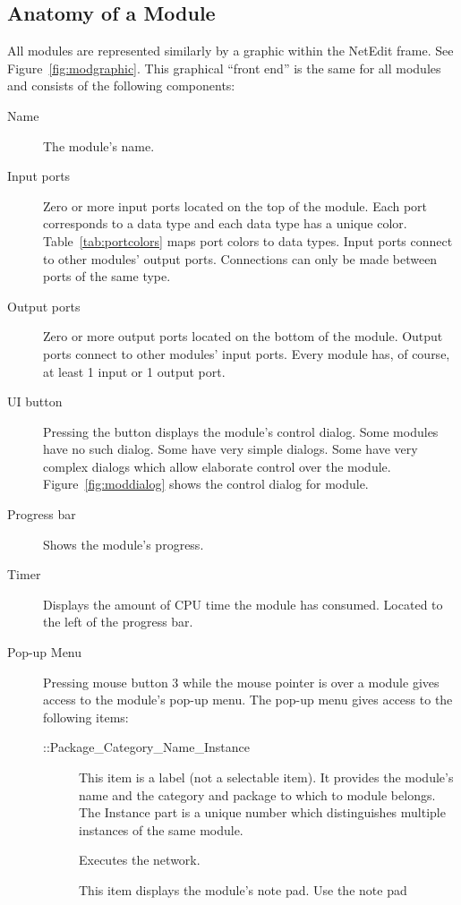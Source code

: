 \subsection{Anatomy of a Module}
\label{sec:modanatomy}

All modules are represented similarly by a graphic within the NetEdit frame.
See Figure~\ref{fig:modgraphic}. This graphical ``front end'' is the same
for all modules and consists of the following components:

\begin{description}
\item[Name] The module's name.
\item[Input ports] Zero or more input ports located on the top of the
  module.  Each port corresponds to a data type and each data type has a
  unique color.  Table~\ref{tab:portcolors} maps port colors to data types.
  Input ports connect to other modules' output ports.  Connections can only
  be made between ports of the same type.
\item[Output ports] Zero or more output ports located on the bottom of the
  module.  Output ports connect to other modules' input ports.  Every
  module has, of course, at least 1 input or 1 output port.
\item[UI button] Pressing the  button displays the module's
  control dialog. Some modules have no such dialog. Some have very simple
  dialogs.  Some have very complex dialogs which allow elaborate control
  over the module.  Figure~\ref{fig:moddialog} shows the control dialog for
   module.
\item[Progress bar] Shows the module's progress.
\item[Timer] Displays the amount of CPU time the module has consumed.
  Located to the left of the progress bar.
\item[Pop-up Menu] Pressing mouse button 3 while the mouse
  pointer is over a module gives access to the module's pop-up menu.  The
  pop-up menu gives access to the following items:
  \begin{description}
  \item[::Package\_Category\_Name\_Instance] This item is a label (not a
    selectable item).  It provides the module's name and the category and
    package to which to module belongs.  The Instance part is a unique
    number which distinguishes multiple instances of the same module.
  \item[] Executes the network.
  \item[] This item displays the module's note pad.  Use the note pad

\end{description}
\end{description}
